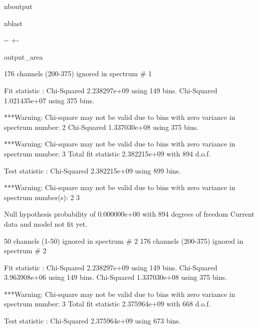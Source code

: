 \documentclass[letterpaper,10pt,english]{sphinxmanual}
\newlength\nbsphinxcodecellspacing
\begin{document}
\begin{sphinxuseclass}{nboutput}
\begin{sphinxuseclass}{nblast}
{

\kern-\sphinxverbatimsmallskipamount\kern-\baselineskip
\kern+\FrameHeightAdjust\kern-\fboxrule
\vspace{\nbsphinxcodecellspacing}

\begin{sphinxuseclass}{output_area}
\begin{sphinxuseclass}{}


\begin{sphinxVerbatim}[commandchars=\\\{\}]
   176 channels (200-375) ignored in spectrum \#     1

Fit statistic  : Chi-Squared              2.238297e+09     using 149 bins.
                 Chi-Squared              1.021435e+07     using 375 bins.

***Warning: Chi-square may not be valid due to bins with zero variance
            in spectrum number: 2
                 Chi-Squared              1.337030e+08     using 375 bins.

***Warning: Chi-square may not be valid due to bins with zero variance
            in spectrum number: 3
Total fit statistic                       2.382215e+09     with 894 d.o.f.

Test statistic : Chi-Squared              2.382215e+09     using 899 bins.

***Warning: Chi-square may not be valid due to bins with zero variance
            in spectrum number(s): 2 3

 Null hypothesis probability of 0.000000e+00 with 894 degrees of freedom
 Current data and model not fit yet.

    50 channels (1-50) ignored in spectrum \#     2
   176 channels (200-375) ignored in spectrum \#     2

Fit statistic  : Chi-Squared              2.238297e+09     using 149 bins.
                 Chi-Squared              3.963908e+06     using 149 bins.
                 Chi-Squared              1.337030e+08     using 375 bins.

***Warning: Chi-square may not be valid due to bins with zero variance
            in spectrum number: 3
Total fit statistic                       2.375964e+09     with 668 d.o.f.

Test statistic : Chi-Squared              2.375964e+09     using 673 bins.


\end{sphinxVerbatim}
\end{sphinxuseclass}
\end{sphinxuseclass}}
\end{sphinxuseclass}
\end{sphinxuseclass}
\end{document}
